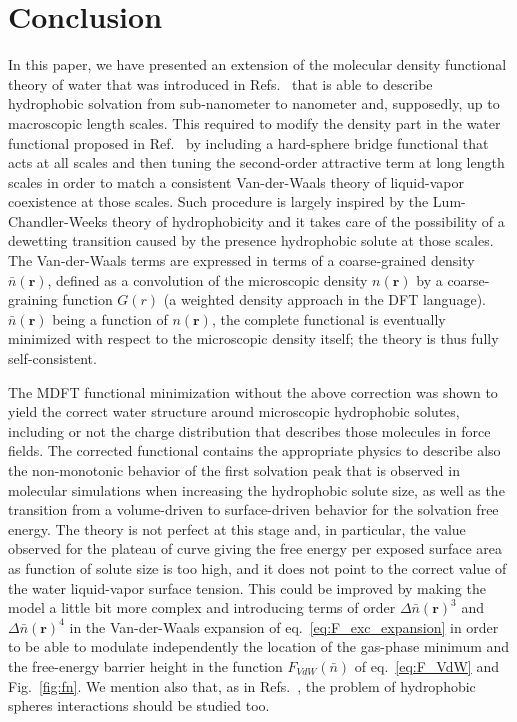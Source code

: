\documentclass[aip,jcp,preprint]{revtex4-1}
\newcommand{\rhon}{{n\left({\mathbf r}\right)}}
\newcommand{\rhonbar}{\bar{n}({\mathbf r})}
\begin{document}
\section{Conclusion}

In this paper, we have presented an extension of the molecular density functional theory of water that was introduced in Refs.~ that is able to describe hydrophobic solvation from sub-nanometer to nanometer and, supposedly, up to macroscopic length scales.  This required to modify the density part in the water functional proposed in Ref.~ by including a hard-sphere bridge functional that acts at all scales and then tuning the second-order attractive term at long length scales in order to match a  consistent Van-der-Waals theory of liquid-vapor coexistence at those scales. Such procedure is largely inspired  by the Lum-Chandler-Weeks theory of hydrophobicity and it takes care of the possibility of a dewetting transition caused by the presence hydrophobic solute at those scales.  The Van-der-Waals terms are expressed in terms of a  coarse-grained density $\rhonbar$, defined as a convolution of the microscopic density $\rhon$ by a coarse-graining function $G(r)$ (a  weighted density  approach in the DFT language\cite{sun01}). $\rhonbar$ being a function of $\rhon$, the complete functional is eventually minimized with respect to the microscopic density itself; the theory is thus fully self-consistent.

The MDFT functional minimization without the above correction was shown to yield the correct water structure around microscopic hydrophobic solutes, including or not the charge distribution that describes those molecules in force fields. The corrected functional contains the appropriate physics to describe also the non-monotonic behavior of the first solvation peak that is observed in molecular simulations when increasing the hydrophobic solute size, as well as the transition from a volume-driven to surface-driven behavior for the solvation free energy. The theory is not perfect at this stage and, in particular,  the value observed for the plateau of curve giving the free energy per exposed surface area  as function of solute size is too high, and  it does not point to the correct value of the water liquid-vapor surface tension. This could be improved by making the model  a little bit more complex and introducing terms of order $\Delta \rhonbar^3$ and  $\Delta \rhonbar^4$ in the Van-der-Waals expansion of eq.~\ref{eq:F_exc_expansion} in order to be able to modulate independently the location of the gas-phase minimum and the free-energy barrier height in the function $F_{VdW}(\bar{n})$ of eq.~\ref{eq:F_VdW} and Fig.~\ref{fig:fn}. We mention also that, as in Refs.~, the problem of hydrophobic spheres interactions should be studied too.
\end{document}
